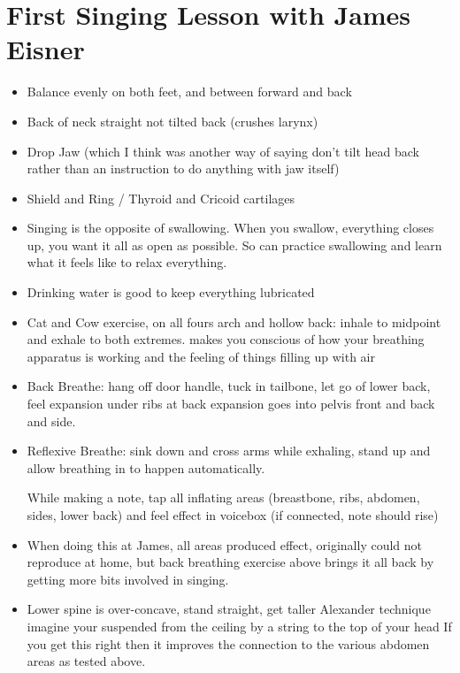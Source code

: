 \documentclass[14pt,a4paper]{memoir}
\begin{document}
\chapter*{First Singing Lesson with James Eisner}

\begin{itemize}
\item Balance evenly on both feet, and between forward and back

\item Back of neck straight not tilted back (crushes larynx)

\item Drop Jaw (which I think was another way of saying don't tilt head back rather than an instruction to do anything with jaw itself)

\item Shield and Ring / Thyroid and Cricoid cartilages

\item Singing is the opposite of swallowing. When you swallow, everything closes up, you want it all as open as possible.
So can practice swallowing and learn what it feels like to relax everything.

\item Drinking water is good to keep everything lubricated

\item Cat and Cow exercise, on all fours arch and hollow back: inhale to midpoint and exhale to both extremes.
makes you conscious of how your breathing apparatus is working and the feeling of things filling up with air

\item Back Breathe: hang off door handle, tuck in tailbone, let go of lower back, feel expansion under ribs at back
expansion goes into pelvis front and back and side. 

\item Reflexive Breathe: sink down and cross arms while exhaling, stand up and allow breathing in to happen automatically.

While making a note, tap all inflating areas (breastbone, ribs, abdomen, sides, lower back) and feel effect in voicebox (if connected, note should rise)
\item When doing this at James, all areas produced effect, originally could not reproduce at home, but back breathing exercise above brings it all back by getting more bits involved in singing.

\item Lower spine is over-concave, stand straight, get taller
Alexander technique imagine your suspended from the ceiling by a string to the top of your head
If you get this right then it improves the connection to the various abdomen areas as tested above.


\end{itemize}
\end{document}
